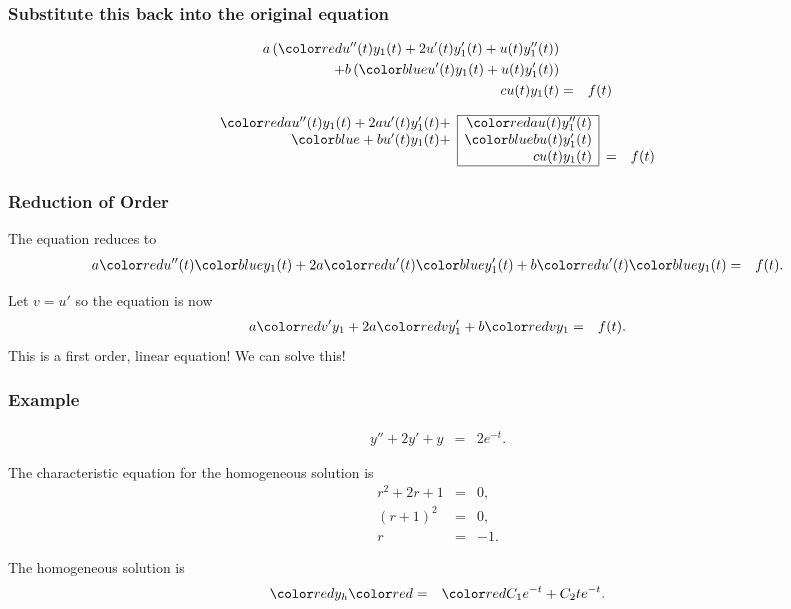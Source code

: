 \begin{frame}
  \frametitle{Substitute this back into the original equation}

  \begin{eqnarray*}
    a \lp \redText{u''(t) y_1(t) + 2 u'(t) y_1'(t) + u(t) y_1''(t)} \rp & & \\
    + b \lp \blueText{u'(t) y_1(t) + u(t) y_1'(t)} \rp & & \\
    c u(t) y_1(t) & = & f(t) 
  \end{eqnarray*}

  \begin{eqnarray*}
    \begin{array}{r|r|cl}
      \cline{2-2}
      \redText{ a u''(t) y_1(t) + 2 a u'(t) y_1'(t) +} & \redText{a u(t) y_1''(t)}  & & \\ 
      \blueText{+ b  u'(t) y_1(t) + } & \blueText{b u(t) y_1'(t)}  & & \\
      & c u(t) y_1(t) & = & f(t)  \\       \cline{2-2}
    \end{array}
  \end{eqnarray*}

\end{frame}


\begin{frame}
  \frametitle{Reduction of Order}

  The equation reduces to
  \begin{eqnarray*}
    a \redText{u''(t)} \blueText{y_1(t)} + 2 a \redText{u'(t)} \blueText{y_1'(t)} + b  \redText{u'(t)} \blueText{y_1(t)} & = & f(t).
  \end{eqnarray*}

  Let $v=u'$ so the equation is now
  \begin{eqnarray*}
    a \redText{v'} y_1 + 2 a \redText{v} y_1' + b \redText{v} y_1 & = & f(t).
  \end{eqnarray*}
  This is a first order, linear equation! We can solve this!


\end{frame}


\begin{frame}
  \frametitle{Example}

  \begin{eqnarray*}
    y'' + 2 y' + y & = & 2 e^{-t}.
  \end{eqnarray*}

  The characteristic equation for the homogeneous solution is
  \begin{eqnarray*}
    r^2 + 2r + 1 & = & 0, \\
    (r+1)^2 & = & 0, \\
    r & = & -1.
  \end{eqnarray*}

  The homogeneous solution is
  \begin{eqnarray*}
    \redText{y_h} & \redText{=} & \redText{C_1 e^{-t} + C_2 t e^{-t}}.
  \end{eqnarray*}

\end{frame}



